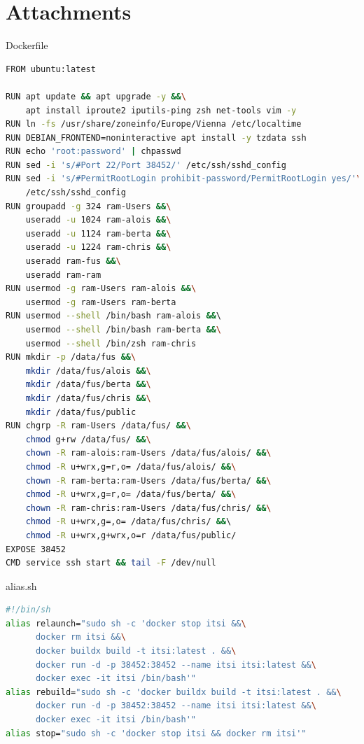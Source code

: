 \documentclass[a4paper]{article}
\begin{document}
\section{Attachments}
Dockerfile
\begin{lstlisting}[language=bash]
FROM ubuntu:latest

RUN apt update && apt upgrade -y &&\
    apt install iproute2 iputils-ping zsh net-tools vim -y
RUN ln -fs /usr/share/zoneinfo/Europe/Vienna /etc/localtime
RUN DEBIAN_FRONTEND=noninteractive apt install -y tzdata ssh
RUN echo 'root:password' | chpasswd
RUN sed -i 's/#Port 22/Port 38452/' /etc/ssh/sshd_config
RUN sed -i 's/#PermitRootLogin prohibit-password/PermitRootLogin yes/'\
    /etc/ssh/sshd_config
RUN groupadd -g 324 ram-Users &&\
    useradd -u 1024 ram-alois &&\
    useradd -u 1124 ram-berta &&\
    useradd -u 1224 ram-chris &&\
    useradd ram-fus &&\
    useradd ram-ram
RUN usermod -g ram-Users ram-alois &&\
    usermod -g ram-Users ram-berta
RUN usermod --shell /bin/bash ram-alois &&\ 
    usermod --shell /bin/bash ram-berta &&\
    usermod --shell /bin/zsh ram-chris 
RUN mkdir -p /data/fus &&\
    mkdir /data/fus/alois &&\
    mkdir /data/fus/berta &&\
    mkdir /data/fus/chris &&\
    mkdir /data/fus/public
RUN chgrp -R ram-Users /data/fus/ &&\
    chmod g+rw /data/fus/ &&\
    chown -R ram-alois:ram-Users /data/fus/alois/ &&\
    chmod -R u+wrx,g=r,o= /data/fus/alois/ &&\
    chown -R ram-berta:ram-Users /data/fus/berta/ &&\
    chmod -R u+wrx,g=r,o= /data/fus/berta/ &&\
    chown -R ram-chris:ram-Users /data/fus/chris/ &&\
    chmod -R u+wrx,g=,o= /data/fus/chris/ &&\ 
    chmod -R u+wrx,g+wrx,o=r /data/fus/public/
EXPOSE 38452
CMD service ssh start && tail -F /dev/null
\end{lstlisting}
alias.sh
\begin{lstlisting}[language=bash]
#!/bin/sh
alias relaunch="sudo sh -c 'docker stop itsi &&\
      docker rm itsi &&\
      docker buildx build -t itsi:latest . &&\
      docker run -d -p 38452:38452 --name itsi itsi:latest &&\
      docker exec -it itsi /bin/bash'"
alias rebuild="sudo sh -c 'docker buildx build -t itsi:latest . &&\
      docker run -d -p 38452:38452 --name itsi itsi:latest &&\
      docker exec -it itsi /bin/bash'"
alias stop="sudo sh -c 'docker stop itsi && docker rm itsi'"
\end{lstlisting}
\end{document}
